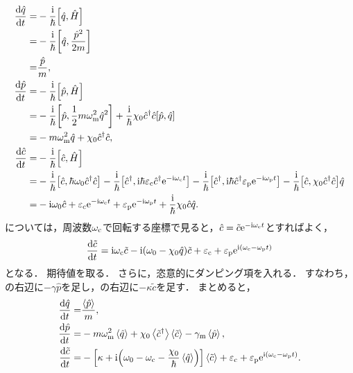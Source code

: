 \documentclass{report}
\begin{document}
      \begin{align}
        \dv{\hat{q}}{t} =& -\frac{\mathrm{i}}{\hbar}\qty[\hat{q}, \hat{H}] \\ 
        =& -\frac{\mathrm{i}}{\hbar}\qty[\hat{q}, \frac{\hat{p}^2}{2m}] \\ 
        =& \frac{\hat{p}}{m}, \\ 
        \dv{\hat{p}}{t} =& -\frac{\mathrm{i}}{\hbar}\qty[\hat{p}, \hat{H}] \\ 
        =& -\frac{\mathrm{i}}{\hbar}\qty[\hat{p}, \frac{1}{2}m\omega^2_{\mathrm{m}}\hat{q}^2] + \frac{\mathrm{i}}{\hbar}\chi_0\hat{c}^{\dag}\hat{c}\qty[\hat{p}, \hat{q}] \\ 
        =& -m\omega^2_{\mathrm{m}}\hat{q} + \chi_0\hat{c}^{\dag}\hat{c}, \label{PhysRevA.81.041803-eom-p} \\ 
        \dv{\hat{c}}{t} =& -\frac{\mathrm{i}}{\hbar}\qty[\hat{c}, \hat{H}] \\ 
        =& -\frac{\mathrm{i}}{\hbar}\qty[\hat{c}, \hbar\omega_0\hat{c}^{\dag}\hat{c}] - \frac{\mathrm{i}}{\hbar}\qty[\hat{c}^{\dag}, \mathrm{i}\hbar\varepsilon_{\mathrm{c}}\hat{c}^{\dag}\mathrm{e}^{-\mathrm{i}\omega_{\mathrm{c}}t}] - \frac{\mathrm{i}}{\hbar}\qty[\hat{c}^{\dag}, \mathrm{i}\hbar\hat{c}^{\dag}\varepsilon_{\mathrm{p}}\mathrm{e}^{-\mathrm{i}\omega_{\mathrm{p}}t}] - \frac{\mathrm{i}}{\hbar}\qty[\hat{c}, \chi_0\hat{c}^{\dag}\hat{c}]\hat{q} \\ 
        =& -\mathrm{i}\omega_0\hat{c} + \varepsilon_{\mathrm{c}}\mathrm{e}^{-\mathrm{i}\omega_{\mathrm{c}}t} + \varepsilon_{\mathrm{p}}\mathrm{e}^{-\mathrm{i}\omega_{\mathrm{p}}t} + \frac{\mathrm{i}}{\hbar}\chi_0\hat{c}\hat{q}\label{PhysRevA.81.041803-eom-c-1}.
      \end{align}
      については，周波数$\omega_{\mathrm{c}}$で回転する座標で見ると，$\hat{c} = \tilde{c}\mathrm{e}^{-\mathrm{i}\omega_{\mathrm{c}}t}$とすればよく，
      \begin{align}
        \dv{\tilde{c}}{t} = \mathrm{i}\omega_{\mathrm{c}}\tilde{c} - \mathrm{i}\qty(\omega_0 - \chi_0\hat{q})\tilde{c} + \varepsilon_{\mathrm{c}} + \varepsilon_{\mathrm{p}}\mathrm{e}^{\mathrm{i}\qty(\omega_{\mathrm{c}} - \omega_{\mathrm{p}}t)} \label{PhysRevA.81.041803-eom-c-2}
      \end{align}
      となる．
      期待値を取る．
      さらに，恣意的にダンピング項を入れる．
      すなわち，の右辺に$-\gamma\hat{p}$を足し，の右辺に$-\kappa\tilde{c}$を足す．
      まとめると，
      \begin{align}
        \dv{\hat{q}}{t} =& \frac{\ev{\hat{p}}}{m}, \label{PhysRevA.81.041803-eom-q-ev} \\ 
        \dv{\hat{p}}{t} =& -m\omega^2_{\r{m}}\ev{\hat{q}} + \chi_0\ev{\tilde{c}^{\dag}}\ev{\tilde{c}} - \gamma_{\r{m}}\ev{\hat{p}}, \label{PhysRevA.81.041803-eom-p-ev} \\ 
        \dv{\tilde{c}}{t} =& -\qty[\kappa + \i\qty(\omega_0 - \omega_{\r{c}} - \frac{\chi_0}{\hbar}\ev{\hat{q}})]\ev{\tilde{c}} + \epsilon_{\r{c}} + \epsilon_{\r{p}}\e^{\i\qty(\omega_{\r{c}} - \omega_{\r{p}}t)} \label{PhysRevA.81.041803-eom-c-ev}.
      \end{align}
\end{document}
